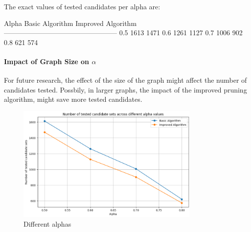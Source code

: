 The exact values of tested candidates per alpha are:

Alpha      Basic Algorithm      Improved Algorithm
--------------------------------------------------
0.5        1613                 1471
0.6        1261                 1127
0.7        1006                 902
0.8        621                  574


\paragraph{Impact of Graph Size on \(\alpha\)}
For future research, the effect of the size of the graph might affect the number of candidates tested. Possbily, in larger graphs, the impact of the improved pruning algorithm, might save more tested candidates.

\begin{figure}[h]
    \centering
    \includegraphics[width=0.8\textwidth]
    {figures/improved_algorithm.png}
    \caption{Different alphas}
    \label{fig:improved_algorithm}
\end{figure}
